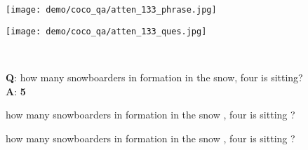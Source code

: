 \documentclass{article}
\def \fsize {1pt}
\begin{document}
\begin{figure}[tb]
\begin{minipage}{0.22\linewidth}
\end{minipage}
\begin{minipage}{0.22\linewidth}
\texttt{[image: demo/coco\_qa/atten\_133\_phrase.jpg]}
\end{minipage}
\begin{minipage}{0.22\linewidth}
\texttt{[image: demo/coco\_qa/atten\_133\_ques.jpg]}
\end{minipage}
\\
\begin{minipage}{0.22\linewidth}
\begin{center}
\tiny{\textbf{Q}: how many snowboarders in formation in the snow, four is sitting? \textbf{A}: \textbf{5}}
\end{center}
\end{minipage}
\begin{minipage}{0.22\linewidth}
\begin{center}
\tiny{
\setlength{\fboxsep}{\fsize}
\textcolor[rgb]{0.0980,1.0000,0.8697}{how}
\textcolor[rgb]{0.0000,0.5353,1.0000}{many}
\textcolor[rgb]{0.3131,1.0000,0.6546}{snowboarders}
\textcolor[rgb]{0.0000,0.1431,1.0000}{in}
\textcolor[rgb]{0.0000,0.4412,1.0000}{formation}
\textcolor[rgb]{0.0000,0.1431,1.0000}{in}
\textcolor[rgb]{0.0000,0.3784,1.0000}{the}
\textcolor[rgb]{0.0601,0.9745,0.9077}{snow}
\textcolor[rgb]{0.0000,0.1745,1.0000}{,}
\textcolor[rgb]{0.0000,0.2373,1.0000}{four}
\textcolor[rgb]{0.0000,0.1745,1.0000}{is}
\textcolor[rgb]{0.2292,1.0000,0.7685}{sitting}
\textcolor[rgb]{0.0000,0.2259,1.0000}{?}
}
\end{center}
\end{minipage}
\begin{minipage}{0.22\linewidth}
\begin{center}
\tiny{
\setlength{\fboxsep}{\fsize}
\textcolor[rgb]{0.0474,0.9588,0.9203}{how}
\textcolor[rgb]{1.0000,0.5962,0.0000}{many}
\textcolor[rgb]{0.0000,0.6922,1.0000}{snowboarders}
\textcolor[rgb]{0.0000,0.0000,1.0000}{in}
\textcolor[rgb]{0.0000,0.0000,0.9635}{formation}
\textcolor[rgb]{0.0000,0.0000,0.9813}{in}
\textcolor[rgb]{0.0000,0.0000,0.9635}{the}
\textcolor[rgb]{0.0000,0.5196,1.0000}{snow}
\textcolor[rgb]{0.0000,0.2843,1.0000}{,}
\textcolor[rgb]{0.0000,0.1588,1.0000}{four}
\textcolor[rgb]{0.0000,0.0000,0.9813}{is}
\textcolor[rgb]{0.0000,0.0333,1.0000}{sitting}
\textcolor[rgb]{0.0000,0.0000,0.9456}{?}
}
\end{center}
\end{minipage}

\end{figure}
\end{document}
